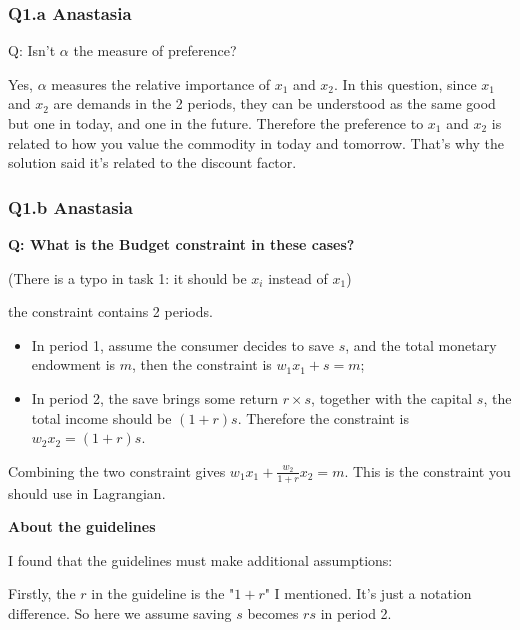 \documentclass{article}
\begin{document}
\subsubsection{Q1.a Anastasia}
Q: Isn't $\alpha$ the measure of preference?

\medskip

Yes, $\alpha$ measures the relative importance of $x_1$ and $x_2$. 
In this question, since $x_1$ and $x_2$ are demands in the 2 periods, they can be understood as the same good but one in today, and one in the future. 
Therefore the preference to $x_1$ and $x_2$ is related to how you value the commodity in today and tomorrow. That's why the solution said it's related to the discount factor.


\subsubsection{Q1.b Anastasia}
\textbf{Q: What is the Budget constraint in these cases?}

\medskip
 (There is a typo in task 1: it should be $x_i$ instead of $x_1$)

\medskip

the constraint contains 2 periods.

\begin{itemize}
\item In period 1, assume the consumer decides to save $s$, and the total monetary endowment is $m$, then the constraint is $w_1 x_1 + s = m$;

\item In period 2, the save brings some return $r \times s$, together with the capital $s$, the total income should be $(1+r)s$. Therefore the constraint is $w_2x_2 = (1+r)s$. 
\end{itemize}

Combining the two constraint gives $w_1 x_1 + \frac{w_2}{1+r} x_2 = m$. This is the constraint you should use in Lagrangian.

\medskip

\textbf{About the guidelines}

\medskip

I found that the guidelines must make additional assumptions:

\medskip

Firstly, the $r$ in the guideline is the "$1+r$" I mentioned. It's just a notation difference. So here we assume saving $s$ becomes $rs$ in period 2.

\smallskip
\end{document}

